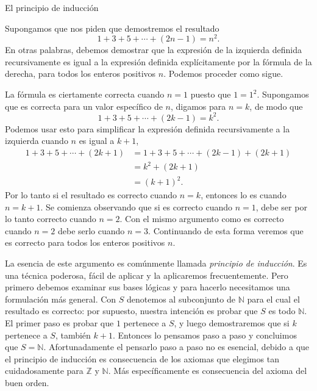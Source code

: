 \documentclass[11pt,spanish,makeidx]{amsbook}
\theoremstyle{definition}
\theoremstyle{remark}
\begin{document}
\begin{section}{El principio de inducción}\label{1.4}

Supongamos que nos piden que demostremos el resultado
$$
1+3+5+\cdots+(2n-1) = n^2.
$$
En otras palabras, debemos demostrar que la expresión de la izquierda definida recursivamente es igual a la expresión definida explícitamente por la fórmula de la derecha, para todos los enteros positivos $n$. Podemos proceder como sigue.

La fórmula es ciertamente correcta cuando $n=1$ puesto que $1=1^2$.  Supongamos que es correcta para un valor específico de $n$, digamos para $n=k$, de modo que
$$
1+3+5+\cdots+(2k-1) = k^2.
$$
Podemos usar esto para simplificar la expresión definida recursivamente a la izquierda cuando $n$ es igual a $k+1$,
$$
\begin{aligned}
1+3+5+\cdots+(2k+1) &= 1+3+5+\cdots+(2k-1) +(2k+1) \\
&=k^2 +(2k+1) \\
&=(k+1)^2.
\end{aligned}
$$
Por lo tanto si el resultado es correcto cuando $n=k$, entonces lo es cuando $n=k+1$. Se comienza observando que si es correcto cuando $n=1$, debe ser por lo tanto correcto cuando $n=2$. Con el mismo argumento como es correcto cuando $n=2$ debe serlo cuando $n=3$. Continuando de esta forma veremos que es correcto para todos los enteros positivos $n$.

La esencia de este argumento es comúnmente llamada {\it principio de inducción}. Es una técnica poderosa, fácil de aplicar y la aplicaremos frecuentemente. Pero primero debemos examinar sus bases lógicas y para hacerlo necesitamos una formulación más general. Con $S$ denotemos al subconjunto de $\mathbb N$ para el cual el resultado es correcto: por supuesto, nuestra intención es probar que $S$ es todo $\mathbb N$. El primer paso es probar que $1$ pertenece a $S$, y luego demostraremos que si $k$ pertenece a $S$, también $k+1$. Entonces lo pensamos paso a paso y concluimos que $S=\mathbb N$. Afortunadamente el pensarlo paso a paso no es esencial, debido a que el principio de inducción es consecuencia de los axiomas que elegimos tan cuidadosamente para $\mathbb Z$ y $\mathbb N$. Más específicamente es consecuencia del axioma del buen orden.


\end{section}
\end{document}
